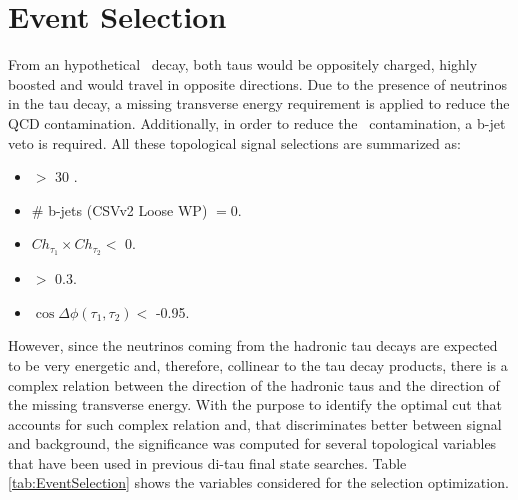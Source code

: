 \chapter{Event Selection}
\label{chap:EventSelection}

\noindent From an hypothetical \Zprimetotauh~decay, both taus would 
be oppositely charged, highly boosted and would travel 
in opposite directions. Due to the presence of neutrinos in 
the tau decay, a missing transverse energy requirement
is applied to reduce the QCD contamination. Additionally, 
in order to reduce the \ttbar~contamination, a b-jet veto 
is required. All these topological signal selections are summarized 
as:

\begin{itemize}
  \item \MET $>$ 30 \GeV.
  \item $\#$ b-jets (CSVv2 Loose WP) $= 0$.
  \item $Ch_{\tau_{1}} \times Ch_{\tau_{2}} <$ 0.
  \item \DRt $>$ 0.3.  
  \item $\cos\Delta \phi (\tau_{1},\tau_{2}) <$ -0.95.
 \end{itemize}

\noindent However, since the neutrinos coming from the hadronic tau decays are expected 
to be very energetic and, therefore, collinear to the tau decay products, there is a 
complex relation between the direction of the hadronic taus and the direction of 
the missing transverse energy. With the purpose to identify the optimal cut 
that accounts for such complex relation and, that discriminates better 
between signal and background, the significance was computed for 
several topological variables that have been used 
in previous di-tau final state searches. Table \ref{tab:EventSelection} shows 
the variables considered for the selection optimization.

